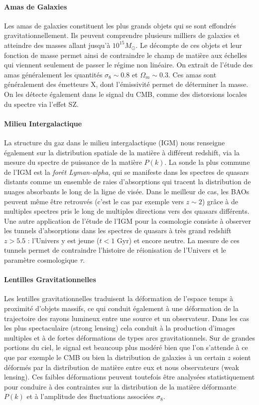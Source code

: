 \paragraph{Amas de Galaxies}
Les amas de galaxies constituent les plus grands objets qui se sont effondrés gravitationnellement. Ils peuvent comprendre plusieurs milliers de galaxies et atteindre des masses allant jusqu'à $10^{15} M_\odot$. Le décompte de ces objets et leur fonction de masse permet ainsi de contraindre le champ de matière aux échelles qui viennent seulement de passer le régime non linéaire. On extrait de l'étude des amas généralement les quantités $\sigma_8\sim 0.8$ et $\Omega_m\sim0.3$. Ces amas sont généralement des émetteurs X, dont l'émissivité permet de déterminer la masse. On les détecte également dans le signal du CMB, comme des distorsions locales du spectre via l'effet SZ.

\paragraph{Milieu Intergalactique}
La structure du gaz dans le milieu intergalactique (IGM) nous renseigne également sur la distribution spatiale de la matière à différent redshift, via la mesure du spectre de puissance de la matière $P(k)$. La sonde la plus commune de l'IGM est la \textit{forêt Lyman-alpha}, qui se manifeste dans les spectres de quasars distants comme un ensemble de raies d'absorptions qui tracent la distribution de nuages absorbants le long de la ligne de visée. Dans le meilleur de cas, les BAOs peuvent même être retrouvés (c'est le cas par exemple vers $z\sim2$) grâce à de multiples spectres pris le long de multiples directions vers des quasars différents. Une autre application de l'étude de l'IGM pour la cosmologie consiste à observer les tunnels d'absorptions dans les spectres de quasars à très grand redshift $z>5.5$ : l'Univers y est jeune ($t<1$ Gyr) et encore neutre. La mesure de ces tunnels permet de contraindre l'histoire de réionisation de l'Univers et le paramètre cosmologique $\tau$.

\paragraph{Lentilles Gravitationnelles}
Les lentilles gravitationnelles traduisent la déformation de l'espace temps à proximité d'objets massifs, ce qui conduit également à une déformation de la trajectoire des rayons lumineux entre une source et un observateur. Dans les cas les plus spectaculaire (strong lensing) cela conduit à la production d'images multiples et à de fortes déformations de types arcs gravitationnels. Sur de grandes portions du ciel, le signal est beaucoup plus modéré bien que l'on s'attende à ce que par exemple le CMB ou bien la distribution de galaxies à un certain $z$ soient déformés par la distribution de matière entre eux et nous observateurs (weak lensing). Ces faibles déformations peuvent toutefois être analysées statistiquement pour conduire à des contraintes sur la distribution de la matière déformante $P(k)$ et à l'amplitude des fluctuations associées $\sigma_8$.

